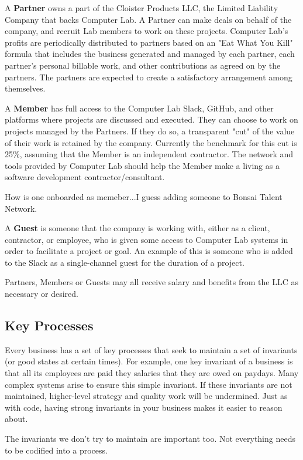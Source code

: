 \documentclass[12pt]{article}
\begin{document}
A \textbf{Partner} owns a part of the Cloister Products LLC, the Limited Liability
Company that backs Computer Lab.  A Partner can make deals on behalf of the
company, and recruit Lab members to work on these projects.  Computer Lab's
profits are periodically distributed to partners based on an "Eat What You Kill"
formula that includes the business generated and managed by each partner, each
partner's personal billable work, and other contributions as agreed on by the
partners.  The partners are expected to create a satisfactory arrangement among
themselves.

A \textbf{Member} has full access to the Computer Lab Slack, GitHub, and other
platforms where projects are discussed and executed.  They can choose to work on
projects managed by the Partners.  If they do so, a transparent "cut" of the
value of their work is retained by the company.  Currently the benchmark for
this cut is 25\%, assuming that the Member is an independent contractor.  The
network and tools provided by Computer Lab should help the Member make a living
as a software development contractor/consultant.

How is one onboarded as memeber...I guess adding someone to Bonsai Talent
Network.

A \textbf{Guest} is someone that the company is working with, either as a client,
contractor, or employee, who is given some access to Computer Lab systems in
order to facilitate a project or goal.  An example of this is someone who is
added to the Slack as a single-channel guest for the duration of a project.

Partners, Members or Guests may all receive salary and benefits from
the LLC as necessary or desired.

\subsection{Key Processes}
Every business has a set of key processes that seek to maintain a set of
invariants (or good states at certain times). For example, one key invariant of
a business is that all its employees are paid they salaries that they are owed
on paydays. Many complex systems arise to ensure this simple invariant.
If these invariants are not maintained, higher-level strategy and quality work
will be undermined. Just as with code, having strong invariants in your business
makes it easier to reason about.

The invariants we don't try to maintain are important too. Not everything needs
to be codified into a process.
\end{document}
